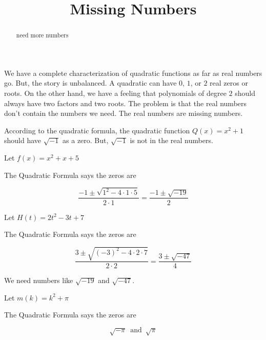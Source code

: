 \documentclass{ximera}
\title{Missing Numbers}
\begin{document}
\begin{abstract}
need more numbers
\end{abstract}
\maketitle




We have a complete characterization of quadratic functions as far as real numbers go.  But, the story is unbalanced.  A quadratic can have $0$, $1$, or $2$ real zeros or roots.  On the other hand, we have a feeling that polynomials of degree $2$ should always have two factors and two roots.  The problem is that the real numbers don't contain the numbers we need.  The real numbers are missing numbers.


According to the quadratic formula, the quadratic function $Q(x) = x^2 + 1$ should have $\sqrt{-1}$ as a zero.  But, $\sqrt{-1}$ is not in the real numbers. 




\begin{example}  
   
  
Let $f(x) = x^2 + x + 5$


The Quadratic Formula says the zeros are 


\[
\frac{-1 \pm \sqrt{1^2 - 4 \cdot 1 \cdot 5}}{2 \cdot 1} = \frac{-1 \pm \sqrt{-19}}{2}
\]


\end{example}






\begin{example}  
   
  
Let $H(t) = 2t^2 - 3t + 7$


The Quadratic Formula says the zeros are 


\[
\frac{3 \pm \sqrt{(-3)^2 - 4 \cdot 2 \cdot 7}}{2 \cdot 2} = \frac{3 \pm \sqrt{-47}}{4}
\]


\end{example}



We need numbers like $\sqrt{-19}$ and $\sqrt{-47}$. \\









\begin{example}  
   
  
Let $m(k) = k^2 + \pi $


The Quadratic Formula says the zeros are 


\[
\sqrt{-\pi} \, \text{ and } \, \sqrt{\pi}
\]


\end{example}
\end{document}
